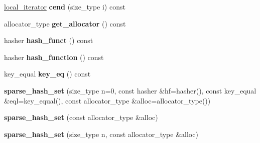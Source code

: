 \begin{DoxyCompactItemize}
\item 
\hyperlink{classspp___1_1_two__d__iterator}{local\+\_\+iterator} {\bfseries cend} (size\+\_\+type i) const \hypertarget{classspp___1_1sparse__hash__set_a1b3da78c4712744e2fa463378af94791}{}\label{classspp___1_1sparse__hash__set_a1b3da78c4712744e2fa463378af94791}

\item 
allocator\+\_\+type {\bfseries get\+\_\+allocator} () const \hypertarget{classspp___1_1sparse__hash__set_ae85ac6723e77ffc6c527cf714a97ce2e}{}\label{classspp___1_1sparse__hash__set_ae85ac6723e77ffc6c527cf714a97ce2e}

\item 
hasher {\bfseries hash\+\_\+funct} () const \hypertarget{classspp___1_1sparse__hash__set_a34a66e5e8874799794ffe18160e58cc4}{}\label{classspp___1_1sparse__hash__set_a34a66e5e8874799794ffe18160e58cc4}

\item 
hasher {\bfseries hash\+\_\+function} () const \hypertarget{classspp___1_1sparse__hash__set_a6e4354695fcf06f2765f6682b6ffc205}{}\label{classspp___1_1sparse__hash__set_a6e4354695fcf06f2765f6682b6ffc205}

\item 
key\+\_\+equal {\bfseries key\+\_\+eq} () const \hypertarget{classspp___1_1sparse__hash__set_a488585d8226b2487fcf63efdfdfaf003}{}\label{classspp___1_1sparse__hash__set_a488585d8226b2487fcf63efdfdfaf003}

\item 
{\bfseries sparse\+\_\+hash\+\_\+set} (size\+\_\+type n=0, const hasher \&hf=hasher(), const key\+\_\+equal \&eql=key\+\_\+equal(), const allocator\+\_\+type \&alloc=allocator\+\_\+type())\hypertarget{classspp___1_1sparse__hash__set_ae1fda91e906819dc28ce9a31fca74fef}{}\label{classspp___1_1sparse__hash__set_ae1fda91e906819dc28ce9a31fca74fef}

\item 
{\bfseries sparse\+\_\+hash\+\_\+set} (const allocator\+\_\+type \&alloc)\hypertarget{classspp___1_1sparse__hash__set_ac8cbb9616751951da649d5f2fcde79dd}{}\label{classspp___1_1sparse__hash__set_ac8cbb9616751951da649d5f2fcde79dd}

\item 
{\bfseries sparse\+\_\+hash\+\_\+set} (size\+\_\+type n, const allocator\+\_\+type \&alloc)\hypertarget{classspp___1_1sparse__hash__set_a20bfc8288830c4c52b91f699b0e12f16}{}\label{classspp___1_1sparse__hash__set_a20bfc8288830c4c52b91f699b0e12f16}


\end{DoxyCompactItemize}
